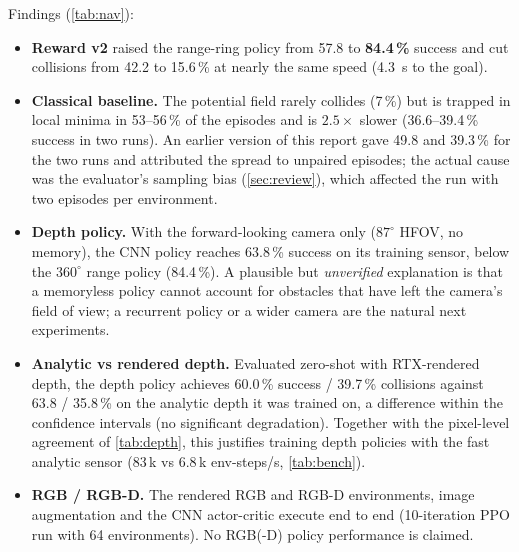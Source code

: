 \documentclass[11pt,a4paper]{article}
\begin{document}
\begin{table}[h]\centering\small
\resizebox{\linewidth}{!}{}
\caption{Obstacle navigation at full density (curriculum off). The depth policy (trained 900 iterations on analytic
depth) is evaluated both on its training sensor and zero-shot on RTX-rendered depth. Minimum clearance is measured
from the vehicle centre to the nearest cylinder surface (collision below \SI{35}{cm}).}
\label{tab:nav}
\end{table}
Findings (\cref{tab:nav}):
\begin{itemize}
\item \textbf{Reward v2} raised the range-ring policy from 57.8 to \textbf{84.4\,\%} success and cut collisions from
42.2 to 15.6\,\% at nearly the same speed (\SI{4.3}{s} to the goal).
\item \textbf{Classical baseline.} The potential field rarely collides (7\,\%) but is trapped in local minima in
53--56\,\% of the episodes and is $2.5\times$ slower (36.6--39.4\,\% success in two runs). An earlier version of
this report gave 49.8 and 39.3\,\% for the two runs and attributed the spread to unpaired episodes; the actual cause
was the evaluator's sampling bias (\cref{sec:review}), which affected the run with two episodes per environment.
\item \textbf{Depth policy.} With the forward-looking camera only ($87^\circ$ HFOV, no memory), the CNN policy reaches
63.8\,\% success on its training sensor, below the $360^\circ$ range policy (84.4\,\%). A plausible but
\emph{unverified} explanation is that a memoryless policy cannot account for obstacles that have left the camera's
field of view; a recurrent policy or a wider camera are the natural next experiments.
\item \textbf{Analytic vs rendered depth.} Evaluated zero-shot with RTX-rendered depth, the depth policy achieves
60.0\,\% success / 39.7\,\% collisions against 63.8 / 35.8\,\% on the analytic depth it was trained on, a
difference within the confidence intervals (no significant degradation). Together with the pixel-level agreement of \cref{tab:depth}, this justifies training
depth policies with the fast analytic sensor (83\,k vs 6.8\,k env-steps/s, \cref{tab:bench}).
\item \textbf{RGB / RGB-D.} The rendered RGB and RGB-D environments, image augmentation and the CNN actor-critic
execute end to end (10-iteration PPO run with 64 environments). No RGB(-D) policy performance is claimed.
\end{itemize}
\end{document}
